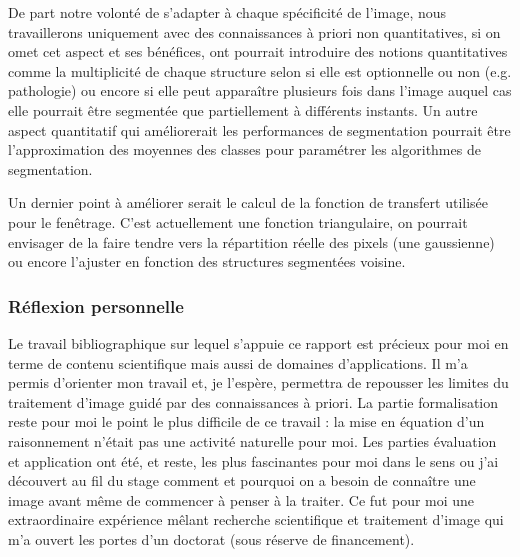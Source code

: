 	De part notre volonté de s'adapter à chaque spécificité de l'image, nous travaillerons uniquement avec des connaissances à priori non quantitatives, si on omet cet aspect et ses bénéfices, ont pourrait introduire des notions quantitatives comme la multiplicité de chaque structure selon si elle est optionnelle ou non (e.g. pathologie) ou encore si elle peut apparaître plusieurs fois dans l'image auquel cas elle pourrait être segmentée que partiellement à différents instants. Un autre aspect quantitatif qui améliorerait les performances de segmentation pourrait être l'approximation des moyennes des classes pour paramétrer les algorithmes de segmentation.
	
	Un dernier point à améliorer serait le calcul de la fonction de transfert utilisée pour le fenêtrage. C'est actuellement une fonction triangulaire, on pourrait envisager de la faire tendre vers la répartition réelle des pixels (une gaussienne) ou encore l'ajuster en fonction des structures segmentées voisine.




	\subsubsection*{Réflexion personnelle}

	Le travail bibliographique sur lequel s'appuie ce rapport est précieux pour moi en terme de contenu scientifique mais aussi de domaines d'applications. Il m'a permis d'orienter mon travail et, je l'espère, permettra de repousser les limites du traitement d'image guidé par des connaissances à priori. La partie formalisation reste pour moi le point le plus difficile de ce travail : la mise en équation d'un raisonnement n'était pas une activité naturelle pour moi. Les parties évaluation et application ont été, et reste, les plus fascinantes pour moi dans le sens ou j'ai découvert au fil du stage comment et pourquoi on a besoin de connaître une image avant même de commencer à penser à la traiter.
	Ce fut pour moi une extraordinaire expérience mêlant recherche scientifique et traitement d'image qui m'a ouvert les portes d'un doctorat (sous réserve de financement). 




